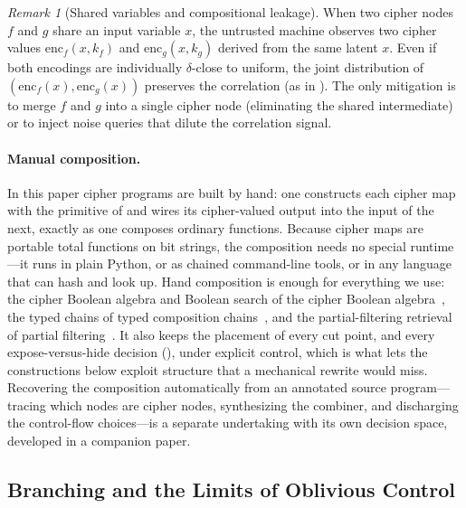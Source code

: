 \documentclass[11pt]{article}
\theoremstyle{definition}
\theoremstyle{plain}
\theoremstyle{remark}
\newtheorem{remark}{Remark}[section]
\newcommand{\enc}{\mathrm{enc}}
\begin{document}
\begin{remark}[Shared variables and compositional leakage]
\label{rem:shared-vars}
When two cipher nodes $f$ and $g$ share an input variable $x$, the
untrusted machine observes two cipher values $\enc_f(x, k_f)$ and
$\enc_g(x, k_g)$ derived from the same latent $x$.
Even if both encodings are individually $\delta$-close to uniform, the
joint distribution of $(\enc_f(x), \enc_g(x))$ preserves the correlation
(as in \cite[Prop.~8.1]{towell2026cipher}).
The only mitigation is to merge $f$ and $g$ into a single cipher node
(eliminating the shared intermediate) or to inject noise queries that
dilute the correlation signal.
\end{remark}

\paragraph{Manual composition.}
In this paper cipher programs are built by hand: one constructs each
cipher map with the primitive of  and wires its
cipher-valued output into the input of the next, exactly as one composes
ordinary functions.
Because cipher maps are portable total functions on bit strings, the
composition needs no special runtime---it runs in plain Python, or as
chained command-line tools, or in any language that can hash and look
up.
Hand composition is enough for everything we use: the cipher Boolean
algebra and Boolean search of the cipher Boolean algebra~\cite{towell2026algebraic}, the typed chains
of typed composition chains~\cite{towell2026algebraic}, and the partial-filtering retrieval of
partial filtering~\cite{towell2026algebraic}.
It also keeps the placement of every cut point, and every
expose-versus-hide decision (), under explicit
control, which is what lets the constructions below exploit structure
that a mechanical rewrite would miss.
Recovering the composition automatically from an annotated source
program---tracing which nodes are cipher nodes, synthesizing the
combiner, and discharging the control-flow choices---is a separate
undertaking with its own decision space, developed in a companion
paper.


\subsection{Branching and the Limits of Oblivious Control}
\label{sec:branching}
\end{document}
